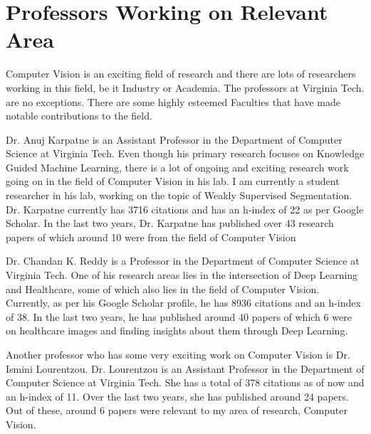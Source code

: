\documentclass[11pt]{article}
\begin{document}
\section{Professors Working on Relevant Area}
Computer Vision is an exciting field of research and there are lots of researchers working in this field, be it Industry or Academia. The professors at Virginia Tech. are no exceptions. There are some highly esteemed Faculties that have made notable contributions to the field. \par
Dr. Anuj Karpatne is an Assistant Professor in the Department of Computer Science at Virginia Tech. Even though his primary research focuses on Knowledge Guided Machine Learning, there is a lot of ongoing and exciting research work going on in the field of Computer Vision in his lab. I am currently a student researcher in his lab, working on the topic of Weakly Supervised Segmentation. Dr. Karpatne currently has 3716 citations and has an h-index of 22 as per Google Scholar. In the last two years, Dr. Karpatne has published over 43 research papers of which around 10 were from the field of Computer Vision  \par
Dr. Chandan K. Reddy is a Professor in the Department of Computer Science at Virginia Tech. One of his research areas lies in the intersection of Deep Learning and Healthcare, some of which also lies in the field of Computer Vision. Currently, as per his Google Scholar profile, he has 8936 citations and an h-index of 38. In the last two years, he has published around 40 papers of which 6 were on healthcare images and finding insights about them through Deep Learning. \par 
Another professor who has some very exciting work on Computer Vision is Dr. Ismini Lourentzou. Dr. Lourentzou is an Assistant Professor in the Department of Computer Science at Virginia Tech. She has a total of 378 citations as of now and an h-index of 11. Over the last two years, she has published around 24 papers. Out of these, around 6 papers were relevant to my area of research, Computer Vision. 
\end{document}
